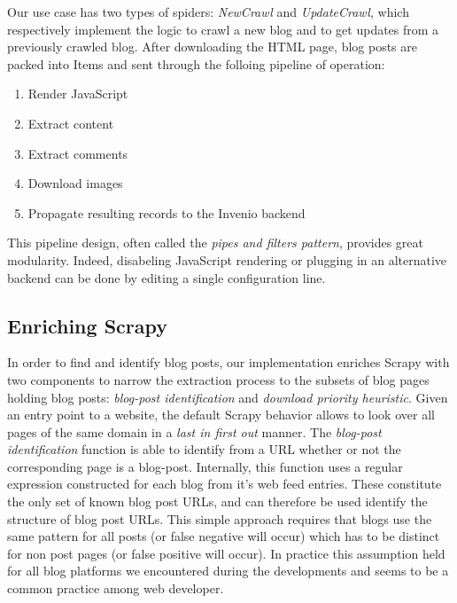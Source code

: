Our use case has two types of spiders: \emph{NewCrawl} and \emph{UpdateCrawl}, which respectively implement the logic to crawl a new blog and to get updates from a previously crawled blog. After downloading the HTML page, blog posts are packed into Items and sent through the folloing pipeline of operation:
\begin{enumerate}[noitemsep]
  \item Render JavaScript
  \item Extract content
  \item Extract comments
  \item Download images
  \item Propagate resulting records to the Invenio backend
\end{enumerate}
This pipeline design, often called the \emph{pipes and filters pattern}\cite[Chapter Messaging Systems]{hohpe2003}, provides great modularity. Indeed, disabeling JavaScript rendering or plugging in an alternative backend can be done by editing a single configuration line.


\subsection{Enriching Scrapy}
In order to find and identify blog posts, our implementation enriches Scrapy with two components to narrow the extraction process to the subsets of blog pages holding blog posts: \emph{blog-post identification} and \emph{download priority heuristic}. Given an entry point to a website, the default Scrapy behavior allows to look over all pages of the same domain in a \emph{last in first out} manner. The \emph{blog-post identification} function is able to identify from a URL whether or not the corresponding page is a blog-post. Internally, this function uses a regular expression constructed for each blog from it's web feed entries. These constitute the only set of known blog post URLs, and can therefore be used identify the structure of blog post URLs. This simple approach requires that blogs use the same pattern for all posts (or false negative will occur) which has to be distinct for non post pages (or false positive will occur). In practice this assumption held for all blog platforms we encountered during the developments and seems to be a common practice among web developer.

